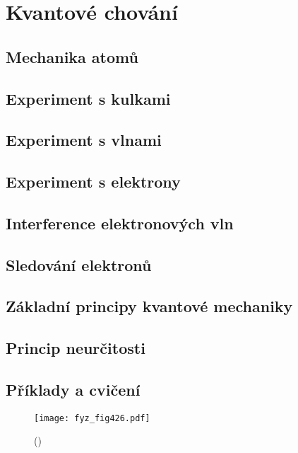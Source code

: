\chapter{Kvantové chování}\label{fyz:IchapXXXVII}
\minitoc
\section{Mechanika atomů}\label{fyz:IchapXXXVIIsecI}
\section{Experiment s kulkami}\label{fyz:IchapXXXVIIsecII}
\section{Experiment s vlnami}\label{fyz:IchapXXXVIIsecIII}
\section{Experiment s elektrony}\label{fyz:IchapXXXVIIsecIV}
\section{Interference elektronových vln}\label{fyz:IchapXXXVIIsecV}
\section{Sledování elektronů}\label{fyz:IchapXXXVIIsecVI}
\section{Základní principy kvantové mechaniky}\label{fyz:IchapXXXVIIsecVII}
\section{Princip neurčitosti}\label{fyz:IchapXXXVIIsecVIII}
\section{Příklady a cvičení}\label{fyz:IchapXXXVIIsecIX}

  \begin{figure}[ht!] %
    \centering
    \texttt{[image: fyz\_fig426.pdf]}
    \caption{
             (\cite[s.~697]{Feynman01})}
    \label{fyz:fig426}
  \end{figure}

